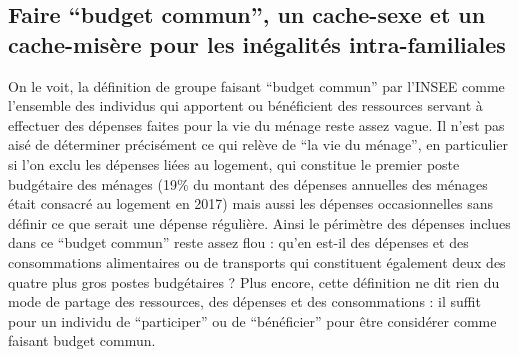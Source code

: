 \documentclass[
  12pt,
]{book}
\begin{document}
\subsection{Faire ``budget commun'', un cache-sexe et un cache-misère
pour les inégalités
intra-familiales}\label{faire-budget-commun-un-cache-sexe-et-un-cache-misuxe8re-pour-les-inuxe9galituxe9s-intra-familiales}

On le voit, la définition de groupe faisant ``budget commun'' par
l'INSEE comme l'ensemble des individus qui apportent ou bénéficient des
ressources servant à effectuer des dépenses faites pour la vie du ménage
reste assez vague. Il n'est pas aisé de déterminer précisément ce qui
relève de ``la vie du ménage'', en particulier si l'on exclu les
dépenses liées au logement, qui constitue le premier poste budgétaire
des ménages (19\% du montant des dépenses annuelles des ménages était
consacré au logement en 2017) mais aussi les dépenses occasionnelles
sans définir ce que serait une dépense régulière. Ainsi le périmètre des
dépenses inclues dans ce ``budget commun'' reste assez flou : qu'en
est-il des dépenses et des consommations alimentaires ou de transports
qui constituent également deux des quatre plus gros postes budgétaires ?
Plus encore, cette définition ne dit rien du mode de partage des
ressources, des dépenses et des consommations : il suffit pour un
individu de ``participer'' ou de ``bénéficier'' pour être considérer
comme faisant budget commun.
\end{document}
